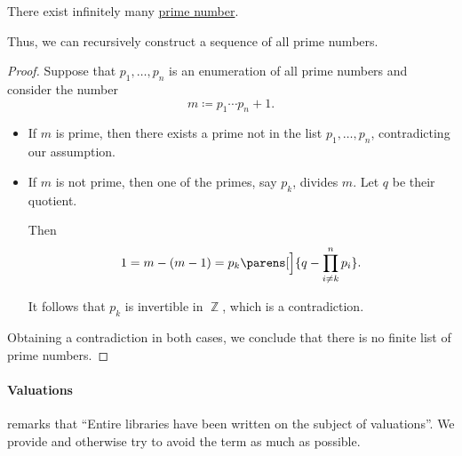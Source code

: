 \begin{theorem}\label{thm:euclids_prime_infinitude_theorem}
  There exist infinitely many \hyperref[def:prime_number]{prime number}.
\end{theorem}
\begin{comments}
  \item Thus, we can recursively construct a sequence of all prime numbers.
\end{comments}
\begin{proof}
  Suppose that \( p_1, \ldots, p_n \) is an enumeration of all prime numbers and consider the number
  \begin{equation*}
    m \coloneqq p_1 \cdots p_n + 1.
  \end{equation*}

  \begin{itemize}
    \item If \( m \) is prime, then there exists a prime not in the list \( p_1, \ldots, p_n \), contradicting our assumption.

    \item If \( m \) is not prime, then one of the primes, say \( p_k \), divides \( m \). Let \( q \) be their quotient.

    Then
    \begin{equation*}
      1 = m - (m - 1) = p_k \parens[\Big]{ q - \prod_{i \neq k}^n p_i }.
    \end{equation*}

    It follows that \( p_k \) is invertible in \( \BbbZ \), which is a contradiction.
  \end{itemize}

  Obtaining a contradiction in both cases, we conclude that there is no finite list of prime numbers.
\end{proof}

\paragraph{Valuations}

 remarks that \enquote{Entire libraries have been written on the subject of valuations}. We provide  and otherwise try to avoid the term as much as possible.


